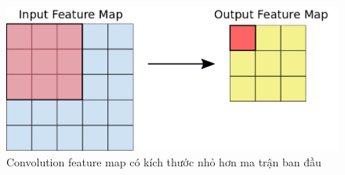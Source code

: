 \FloatBarrier
\begin{figure}[htp]
\begin{center}
\includegraphics[scale=0.4]{chap2/c2_figs/convolution_1.png}
\end{center}
\caption{Convolution feature map có kích thước nhỏ hơn ma trận ban đầu}
\label{fig:convolution-feature}
\end{figure}
\FloatBarrier

